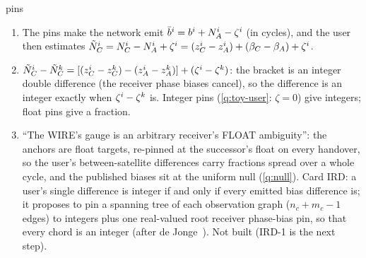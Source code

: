 \begin{answer}{pins}
\solution
\begin{enumerate}[leftmargin=*, itemsep=1pt]
\item The pins make the network emit $\bar b^i = b^i + N^i_A - \zeta^i$ (in
      cycles), and the user then estimates $\tilde N^i_C = N^i_C - N^i_A +
      \zeta^i = (z^i_C - z^i_A) + (\beta_C - \beta_A) + \zeta^i$.
\item $\tilde N^i_C - \tilde N^k_C = [(z^i_C - z^k_C) - (z^i_A - z^k_A)] +
      (\zeta^i - \zeta^k)$: the bracket is an integer double difference (the receiver
      phase biases cancel), so the difference is an integer exactly when $\zeta^i -
      \zeta^k$ is. Integer pins (\cref{q:toy-user}: $\zeta = 0$) give integers; float pins
      give a fraction.
\item ``The WIRE's gauge is an arbitrary receiver's FLOAT ambiguity'': the anchors are
      float targets, re-pinned at the successor's float on every handover, so the
      user's between-satellite differences carry fractions spread over a whole cycle,
      and the published biases sit at the uniform null (\cref{q:null}). Card IRD: a
      user's single difference is integer if and only if every emitted bias
      difference is; it proposes to pin a spanning tree of each observation graph
      ($n_c + m_c - 1$ edges) to integers plus one real-valued root receiver phase-bias
      pin, so that every chord is an integer (after de Jonge~\cite{deJonge1998processing}).
      Not built (IRD-1 is the next step).
\end{enumerate}
\end{answer}

